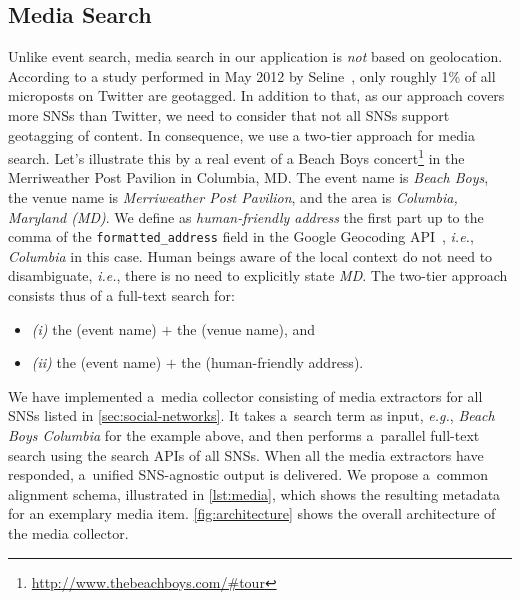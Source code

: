 \documentclass{acm_proc_article-sp}
\let\oldemph\emph
\renewcommand{\emph}[1]{\oldemph{\fontsize{9}{9}\selectfont #1}}
\begin{document}
{\subsection{Media Search} \label{sec:media-search}
Unlike event search, media search in our application is \emph{not} based on geolocation. According to a study performed in May 2012 by Seline~\cite{Quora2012},
only roughly 1\% of all microposts on Twitter are geotagged. In addition to that, as our approach covers more SNSs than Twitter, we need to consider that not all SNSs support geotagging of content. In consequence, we use a two-tier approach for media search. Let's illustrate this by a real event of a Beach Boys concert\footnote{\url{http://www.thebeachboys.com/\#tour}} in the Merriweather Post Pavilion in Columbia, MD. The event name is \emph{Beach Boys},
the venue name is \emph{Merriweather Post Pavilion}, and the area is \emph{Columbia, Maryland (MD)}. We define as \emph{human-friendly address} the first part up to the comma of the \texttt{formatted\_address} field in the Google Geocoding API~\cite{Geocoding2012}, \emph{i.e.}, \emph{Columbia} in this case. Human beings aware of the local context do not need to disambiguate, \emph{i.e.}, there is no need to explicitly state \emph{MD}. The two-tier approach consists thus of a full-text search for:
\begin{itemize}
 \item \emph{(i)} the (event name) $+$ the (venue name), and
 \item \emph{(ii)} the (event name) $+$ the (human-friendly address).
\end{itemize}

We have implemented a~media collector consisting of media extractors for all SNSs
listed in \autoref{sec:social-networks}.
It takes a~search term as input, \emph{e.g.},
\emph{Beach Boys Columbia} for the example above,
and then performs a~parallel full-text search using the search APIs of all SNSs.
When all the media extractors have responded, a~unified SNS-agnostic output is delivered.
We propose a~common alignment schema, illustrated in
\autoref{lst:media}, which shows the resulting metadata for an exemplary media item.
\autoref{fig:architecture} shows the overall architecture of the media collector.

}
\end{document}
